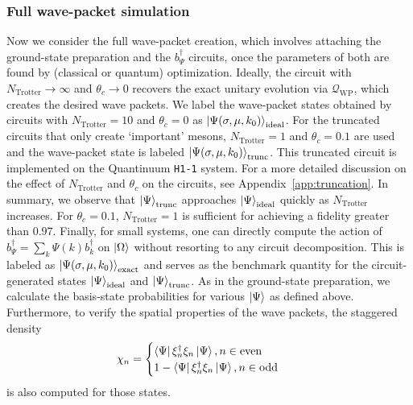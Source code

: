 \documentclass[a4paper,onecolumn,11pt,accepted=2024-10-11]{quantumarticle}
\begin{document}
\subsubsection{Full wave-packet simulation}
\label{sec:4-2}
Now we consider the full wave-packet creation, which involves attaching the ground-state preparation and the $b_\Psi^\dagger$ circuits, once the parameters of both are found by (classical or quantum) optimization. Ideally, the circuit with $N_{\text{Trotter}}\rightarrow\infty$ and $\theta_c\rightarrow0$ recovers the exact unitary evolution via $\mathcal{Q}_{\text{WP}}$, which creates the desired wave packets. We label the wave-packet states obtained by circuits with $N_{\text{Trotter}}=10$ and $\theta_c=0$ as $\ket{\Psi(\sigma,\mu,k_0)}_\text{ideal}$. For the truncated circuits that only create `important' mesons, $N_{\text{Trotter}}=1$ and $\theta_c=0.1$ are used and the wave-packet state is labeled $\ket{\Psi(\sigma,\mu,k_0)}_\text{trunc}$. This truncated circuit is implemented on the Quantinuum \texttt{H1-1} system. For a more detailed discussion on the effect of $N_{\text{Trotter}}$ and $\theta_c$ on the circuits, see Appendix~\ref{app:truncation}. In summary, we observe that $\ket{\Psi}_\text{trunc}$ approaches  $\ket{\Psi}_\text{ideal}$ quickly as $N_{\text{Trotter}}$ increases. For  $\theta_c=0.1$, $N_{\text{Trotter}}=1$ is sufficient for achieving a fidelity greater than $0.97$. Finally, for small systems, one can directly compute the action of $b_\Psi^\dagger = \sum_k{\Psi(k) b_k^\dagger}$ on $\ket{\Omega}$ without resorting to any circuit decomposition. This is labeled as $\ket{\Psi(\sigma,\mu,k_0)}_{\text{exact}}$ and serves as the benchmark quantity for the circuit-generated states $\ket{\Psi}_{\text{ideal}}$ and $\ket{\Psi}_{\text{trunc}}$. As in the ground-state preparation, we calculate the basis-state probabilities for various $\ket{\Psi}$ as defined above. Furthermore, to verify the spatial properties of the wave packets, the staggered density 
%
\begin{align}
    &\chi_n = 
    \begin{cases}
        \bra{\Psi}\xi_n^\dagger\xi_n\ket{\Psi}, n\in \text{even} \\
        1-\bra{\Psi}\xi_n^\dagger\xi_n\ket{\Psi}, n\in \text{odd}
    \end{cases} \label{eq:chi1}
\end{align}
%
is also computed for those states.
\end{document}

